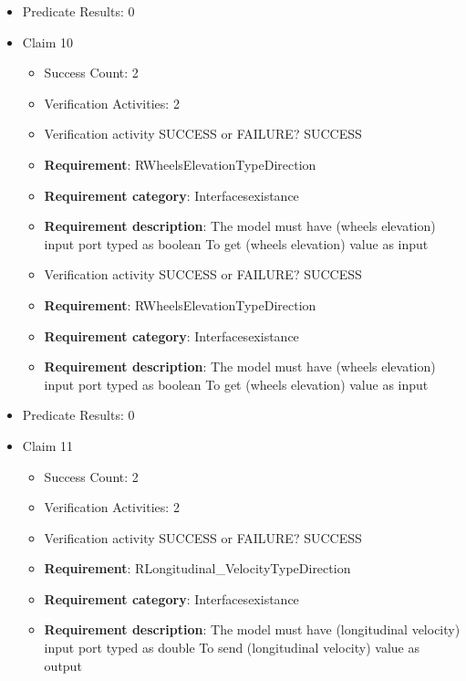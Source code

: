 \documentclass{article}
\begin{document}
\begin{itemize}
\begin{itemize}
				\end{itemize}
				
									    
				\item Predicate Results: 0

  				  \item Claim 10
				\begin{itemize}
			    	\item Success Count: 2 
			    	\item Verification Activities: 2
					\item Verification activity SUCCESS or FAILURE? SUCCESS
		
						\item \textbf{Requirement}: RWheelsElevationTypeDirection 
						\item \textbf{Requirement category}: Interfacesexistance 
						\item \textbf{Requirement description}: The model must have (wheels elevation) input port typed as boolean To get (wheels elevation) value as input
					
					\item Verification activity SUCCESS or FAILURE? SUCCESS
		
						\item \textbf{Requirement}: RWheelsElevationTypeDirection 
						\item \textbf{Requirement category}: Interfacesexistance 
						\item \textbf{Requirement description}: The model must have (wheels elevation) input port typed as boolean To get (wheels elevation) value as input
					
				\end{itemize}
				
									    
				\item Predicate Results: 0

  				  \item Claim 11
				\begin{itemize}
			    	\item Success Count: 2 
			    	\item Verification Activities: 2
					\item Verification activity SUCCESS or FAILURE? SUCCESS
		
						\item \textbf{Requirement}: RLongitudinal\_VelocityTypeDirection 
						\item \textbf{Requirement category}: Interfacesexistance 
						\item \textbf{Requirement description}: The model must have (longitudinal velocity) input port typed as double To send (longitudinal velocity) value as output
					

\end{itemize}
\end{itemize}
\end{document}
